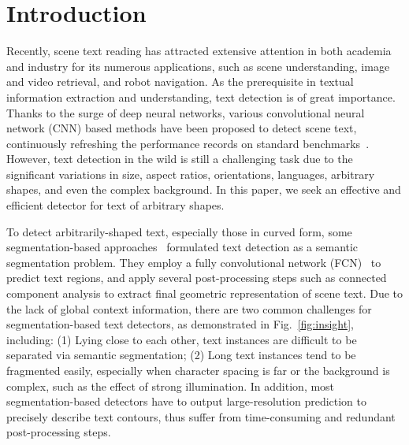 \documentclass[sigconf]{acmart}
\begin{document}







\maketitle

\section{Introduction}



Recently, scene text reading has attracted extensive attention in both academia and industry for its numerous applications, such as scene understanding, image and video retrieval, and robot navigation. As the prerequisite in textual information extraction and understanding, text detection is of great importance. 
Thanks to the surge of deep neural networks, various convolutional neural network (CNN) based methods have been proposed to detect scene text, continuously refreshing the performance records on standard benchmarks~\cite{karatzas2015icdar, nayef2017icdar2017, yuliang2017detecting, ch2017total}.
However, text detection in the wild is still a challenging task due to the significant variations in size, aspect ratios, orientations, languages, arbitrary shapes, and even the complex background. In this paper, we seek an effective and efficient detector for text of arbitrary shapes.





To detect arbitrarily-shaped text, especially those in curved form, some segmentation-based approaches~\cite{zhang2016multi, wu2017self, long2018textsnake,wang2019shape} formulated text detection as a semantic segmentation problem. They employ a fully convolutional network (FCN)~\cite{milletari2016v} to predict text regions, and apply several post-processing steps such as connected component analysis to extract final geometric representation of scene text. 
Due to the lack of global context information, there are two common challenges for segmentation-based text detectors, as demonstrated in Fig.~\ref{fig:insight}, including: (1) Lying close to each other, text instances are difficult to be separated via semantic segmentation; (2) Long text instances tend to be fragmented easily, especially when character spacing is far or the background is complex, such as the effect of strong illumination.
In addition, most segmentation-based detectors have to output large-resolution prediction to precisely describe text contours, thus suffer from time-consuming and redundant post-processing steps.
\end{document}
